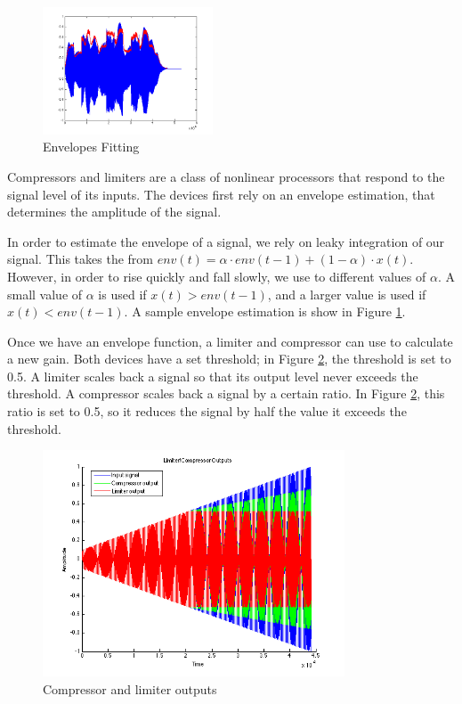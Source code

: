 \documentclass[letterpaper,12pt]{article}
\begin{document}
\begin{figure}
\centering
\includegraphics[width=0.45\textwidth]{figures/envelope-fit.png}
\caption{Envelopes Fitting}
\label{fig:envelopes}
\end{figure}

Compressors and limiters are a class of nonlinear processors that respond to the signal level of its inputs. The devices first rely on an envelope estimation, that determines the amplitude of the signal.

In order to estimate the envelope of a signal, we rely on leaky integration of our signal. This takes the from $env(t) = \alpha \cdot env(t-1) + (1-\alpha) \cdot x(t)$. However, in order to rise quickly and fall slowly, we use to different values of $\alpha$. A small value of $\alpha$ is used if $x(t) > env(t-1)$, and a larger value is used if $x(t) < env(t-1)$. A sample envelope estimation is show in Figure \ref{fig:envelopes}.

Once we have an envelope function, a limiter and compressor can use to calculate a new gain. Both devices have a set threshold; in Figure \ref{fig:compressor-limiter}, the threshold is set to 0.5. A limiter scales back a signal so that its output level never exceeds the threshold. A compressor scales back a signal by a certain ratio. In Figure \ref{fig:compressor-limiter}, this ratio is set to 0.5, so it reduces the signal by half the value it exceeds the threshold.

\begin{figure}[h]
\centering
\includegraphics[width=0.8\textwidth]{figures/limiter-compressor-output.png}
\caption{Compressor and limiter outputs}
\label{fig:compressor-limiter}
\end{figure}
\end{document}
